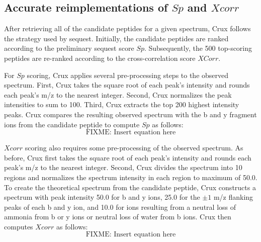 \documentclass[12pt]{article}
\begin{document}
\subsection{Accurate reimplementations of $Sp$ and $Xcorr$}

After retrieving all of the candidate peptides for a given spectrum,
Crux follows the strategy used by {\sc sequest}.  Initially, the candidate
peptides are ranked according to the preliminary {\sc sequest} score $Sp$.
Subsequently, the 500 top-scoring peptides are re-ranked according to
the cross-correlation score $XCorr$.

For $Sp$ scoring, Crux applies several pre-processing steps to the
observed spectrum.  First, Crux takes the square root of each peak's
intensity and rounds each peak's m/z to the nearest integer.  Second,
Crux normalizes the peak intensities to sum to 100.  Third, Crux
extracts the top 200 highest intensity peaks.  Crux compares the
resulting observed spectrum with the b and y fragment ions from the
candidate peptide to compute $Sp$ as follows:
\[
\mbox{FIXME: Insert equation here}
\]

$Xcorr$ scoring also requires some pre-processing of the observed
spectrum.  As before, Crux first takes the square root of each peak's
intensity and rounds each peak's m/z to the nearest integer.  Second,
Crux divides the spectrum into 10 regions and normalizes the spectrum
intensity in each region to maximum of 50.0. To create the theoretical
spectrum from the candidate peptide, Crux constructs a spectrum with
peak intensity 50.0 for b and y ions, 25.0 for the $\pm 1$ m/z flanking
peaks of each b and y ion, and 10.0 for ions resulting from a neutral
loss of ammonia from b or y ions or neutral loss of water from b ions.
Crux then computes $Xcorr$ as follows:
\[
\mbox{FIXME: Insert equation here}
\]
\end{document}
